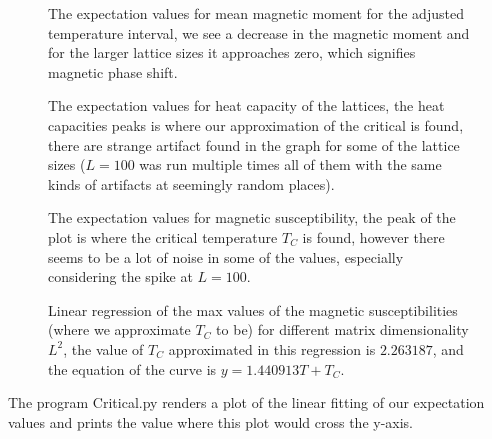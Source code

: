 \documentclass{emulateapj}
\begin{document}
%
%
\begin{figure}[H]

\mbox{}

\caption{The expectation values for mean magnetic moment for the adjusted temperature interval, we see a decrease in the magnetic moment and for the larger lattice sizes it approaches zero, which signifies magnetic phase shift.}
\label{fig:Mmean2}
\end{figure}
%
%
\begin{figure}[H]

\mbox{}

\caption{The expectation values for heat capacity of the lattices, the heat capacities peaks is where our approximation of the critical is found, there are strange artifact found in the graph for some of the lattice sizes ($L=100$ was run multiple times all of them with the same kinds of artifacts at seemingly random places).}
\label{fig:HCMean2}
\end{figure}
%
%
\begin{figure}[H]

\mbox{}

\caption{The expectation values for magnetic susceptibility, the peak of the plot is where the critical temperature $T_C$ is found, however there seems to be a lot of noise in some of the values, especially considering the spike at $L=100$.}
\label{fig:SMean2}
\end{figure}
%
%
\begin{figure}[H]

\mbox{}

\caption{Linear regression of the max values of the magnetic susceptibilities (where we approximate $T_C$ to be) for different matrix dimensionality $L^2$, the value of $T_C$ approximated in this regression is $2.263187$, and the equation of the curve is $y = 1.440913T + T_C$.}
\label{fig:LinearFitting}
\end{figure}
%
The program Critical.py renders a plot of the linear fitting of our expectation values and prints the value where this plot would cross the y-axis.
%
\end{document}
